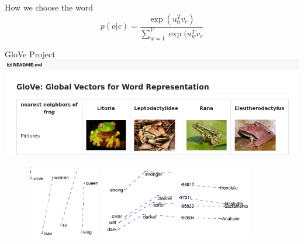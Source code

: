 \documentclass{beamer}
\begin{document}
\begin{frame}{How we  choose the word}
     $$p(o|c) = \frac{\exp(u_0^T v_c)}{\sum_{w=1}^V \exp(u_w^Tv_c}$$
\end{frame}


\begin{frame}{GloVe Project}
    \includegraphics[width=\textwidth]{Glove_github_small.png}

\begin{figure}
   \includegraphics[width=0.29\textwidth]{man_woman_small.jpg}
   \hfill
   \includegraphics[width=0.29\textwidth]{comparative_superlative_small.jpg}
   \hfill
   \includegraphics[width=0.29\textwidth]{city_zip_small.jpg}
\end{figure}

\end{frame}
\end{document}
